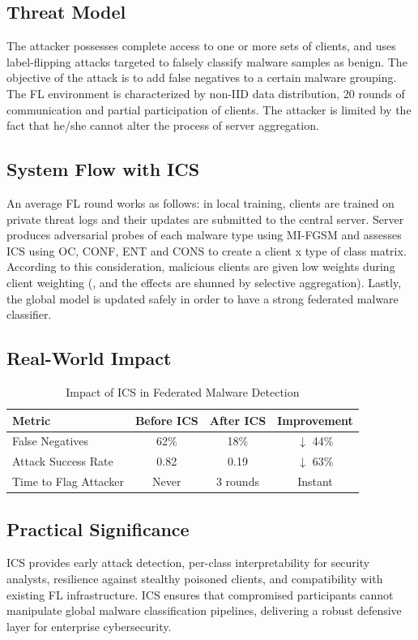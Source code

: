 \documentclass[conference]{IEEEtran}
\begin{document}
\subsection{Threat Model}
The attacker possesses complete access to one or more sets of clients, and uses label-flipping attacks targeted to falsely classify malware samples as benign. The objective of the attack is to add false negatives to a certain malware grouping. The FL environment is characterized by non-IID data distribution, 20 rounds of communication and partial participation of clients. The attacker is limited by the fact that he/she cannot alter the process of server aggregation.


\subsection{System Flow with ICS}
An average FL round works as follows: in local training, clients are trained on private threat logs and their updates are submitted to the central server. Server produces adversarial probes of each malware type using MI-FGSM and assesses ICS using OC, CONF, ENT and CONS to create a client x type of class matrix. According to this consideration, malicious clients are given low weights during client weighting (, and the effects are shunned by selective aggregation). Lastly, the global model is updated safely in order to have a strong federated malware classifier.

\subsection{Real-World Impact}
\begin{table}[H]
\centering
\caption{Impact of ICS in Federated Malware Detection}
\label{tab:ics_malware_impact}
\begin{tabular}{|l|c|c|c|}
\hline
\textbf{Metric} & \textbf{Before ICS} & \textbf{After ICS} & \textbf{Improvement} \\ \hline
False Negatives & 62\% & 18\% & $\downarrow$ 44\% \\ \hline
Attack Success Rate & 0.82 & 0.19 & $\downarrow$ 63\% \\ \hline
Time to Flag Attacker & Never & 3 rounds & Instant \\ \hline
\end{tabular}
\end{table}

\subsection{Practical Significance}
ICS provides early attack detection, per-class interpretability for security analysts, resilience against stealthy poisoned clients, and compatibility with existing FL infrastructure.
ICS ensures that compromised participants cannot manipulate global malware classification pipelines, delivering a robust defensive layer for enterprise cybersecurity.
\end{document}
